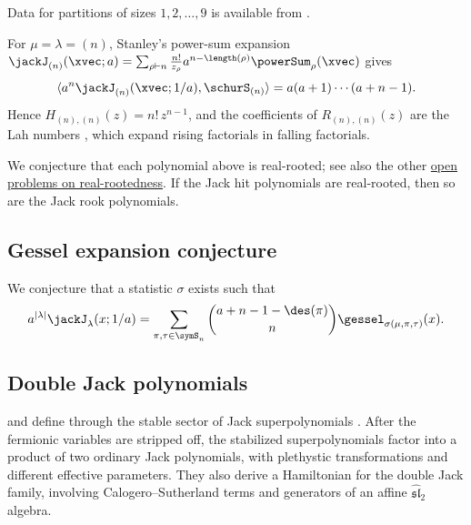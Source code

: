 \begin{example*}
Data for partitions of sizes $1,2,\dotsc,9$ is available
from .

For $\mu=\lambda=(n)$, Stanley's power-sum expansion
$\jackJ_{(n)}(\xvec;a)=\sum_{\rho\vdash n}\frac{n!}{z_\rho}a^{n-\length(\rho)}\powerSum_\rho(\xvec)$
gives
\[
\langle a^{n}\jackJ_{(n)}(\xvec;1/a),\schurS_{(n)}\rangle=a(a+1)\dotsm(a+n-1).
\]
Hence $H_{(n),(n)}(z)=n!\,z^{n-1}$, and the coefficients of
$R_{(n),(n)}(z)$ are the Lah numbers , which expand rising
factorials in falling factorials.

We conjecture that each polynomial above is real-rooted; see also the other
\hyperref[realrootedOpenProblems]{open problems on real-rootedness}.
If the Jack hit polynomials are real-rooted, then so are the Jack rook
polynomials.

\end{example*}


\subsection[jackGesselExpansionConjecture]{Gessel expansion conjecture}

\begin{conjecture}
We conjecture that a statistic $\sigma$ exists such that
\begin{equation*}
a^{|\lambda|}\jackJ_\lambda(x;1/a)
=
\sum_{\pi,\tau \in \symS_n}
\binom{a+n-1-\des(\pi)}{n}
\gessel_{\sigma(\mu,\pi,\tau)}(x).
\end{equation*}
\end{conjecture}

\subsection[jackDouble]{Double Jack polynomials}

 and  define
\label{doubleJackPolynomial}
through the stable sector of Jack superpolynomials \cite{LapointeMathieu2015}.
After the fermionic variables are stripped off, the stabilized
superpolynomials factor into a product of two ordinary Jack polynomials,
with plethystic transformations and different effective parameters.  They
also derive a Hamiltonian for the double Jack family, involving
Calogero--Sutherland terms and generators of an affine $\widehat{\mathfrak{sl}}_2$
algebra.


